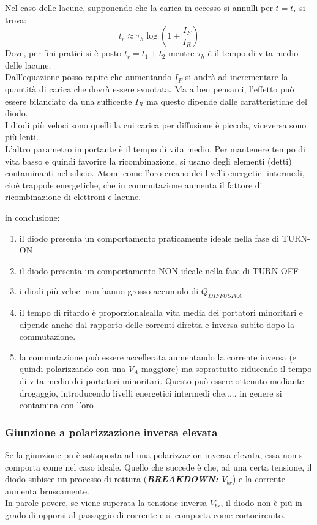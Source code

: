 Nel caso delle lacune, supponendo che la carica in eccesso si annulli per $t=t_r$ si trova:
\begin{equation}
    t_r \approx \tau_h \log\left( 1 + \dfrac{I_F}{I_R}\right)
\end{equation}
Dove, per fini pratici si è posto $t_r=t_1+t_2$ mentre $\tau_h$ è il tempo di vita medio delle lacune.\\
Dall'equazione posso capire che aumentando $I_F$ si andrà ad incrementare la quantità di carica che dovrà essere svuotata. Ma a ben pensarci, l'effetto può essere bilanciato da una sufficente $I_R$ ma questo dipende dalle caratteristiche del diodo.\\
I diodi più veloci sono quelli la cui carica per diffusione è piccola, viceversa sono più lenti.\\
L'altro parametro importante è il tempo di vita medio. Per mantenere tempo di vita basso e quindi favorire la ricombinazione, si usano degli elementi (detti) contaminanti nel silicio. Atomi come l'oro creano dei livelli energetici intermedi, cioè trappole energetiche, che in commutazione aumenta il fattore di ricombinazione di elettroni e lacune.

in conclusione:
\begin{enumerate}
    \item il diodo presenta un comportamento praticamente ideale nella fase di TURN-ON
    
    \item il diodo presenta un comportamento NON ideale nella fase di TURN-OFF

    \item i diodi più veloci non hanno grosso accumulo di $Q_{DIFFUSIVA}$  
    
    \item il tempo di ritardo è proporzionalealla vita media dei portatori minoritari e dipende anche dal rapporto delle correnti diretta e inversa subito dopo la commutazione.

    \item la commutazione può essere accellerata aumentando la corrente inversa (e quindi polarizzando con una $V_A$ maggiore) ma soprattutto riducendo il tempo di vita medio dei portatori minoritari.
    Questo può essere ottenuto mediante drogaggio, introducendo livelli energetici intermedi che.....
    in genere si contamina con l'oro
\end{enumerate}
%
\cleardoublepage%
%
\subsubsection{Giunzione a polarizzazione inversa elevata}
Se la giunzione pn è sottoposta ad una polarizzazion inversa elevata, essa non si comporta come nel caso ideale.
Quello che succede è che, ad una certa tensione, il diodo subisce un processo di rottura (\textbf{\emph{BREAKDOWN: $V_{br}$}}) e la corrente aumenta bruscamente.\\
In parole povere, se viene superata la tensione inversa $V_{br}$, il diodo non è più in grado di opporsi al passaggio di corrente e si comporta come cortocircuito.

